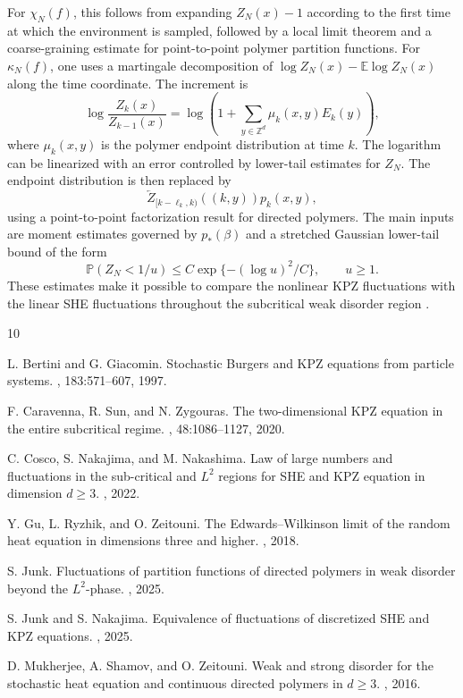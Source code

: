 \documentclass[12pt,centertags,oneside]{amsart}
\numberwithin{equation}{section}
\newcommand{\Z}{\mathbb Z}
\newcommand{\E}{\mathbb E}
\renewcommand{\P}{\mathbb P}
\begin{document}
For $\chi_N(f)$, this follows from expanding $Z_N(x)-1$ according to the first time at which the environment is sampled, followed by a local limit theorem and a coarse-graining estimate for point-to-point polymer partition functions. For $\kappa_N(f)$, one uses a martingale decomposition of $\log Z_N(x)-\E\log Z_N(x)$ along the time coordinate. The increment is
$$
\log\frac{Z_k(x)}{Z_{k-1}(x)}
=\log\left(1+\sum_{y\in\Z^d}\mu_k(x,y)E_k(y)\right),
$$
where $\mu_k(x,y)$ is the polymer endpoint distribution at time $k$. The logarithm can be linearized with an error controlled by lower-tail estimates for $Z_N$. The endpoint distribution is then replaced by
$$
\overleftarrow Z_{[k-\ell_k,k)}((k,y))p_k(x,y),
$$
using a point-to-point factorization result for directed polymers. The main inputs are moment estimates governed by $p_*(\beta)$ and a stretched Gaussian lower-tail bound of the form
$$
\P(Z_N<1/u)\leq C\exp\{-(\log u)^2/C\},\qquad u\geq 1.
$$
These estimates make it possible to compare the nonlinear KPZ fluctuations with the linear SHE fluctuations throughout the subcritical weak disorder region \cite{JunkNakajima2025}.

\begin{thebibliography}{10}

L. Bertini and G. Giacomin.
\newblock Stochastic Burgers and KPZ equations from particle systems.
, 183:571--607, 1997.

F. Caravenna, R. Sun, and N. Zygouras.
\newblock The two-dimensional KPZ equation in the entire subcritical regime.
, 48:1086--1127, 2020.

C. Cosco, S. Nakajima, and M. Nakashima.
\newblock Law of large numbers and fluctuations in the sub-critical and $L^2$ regions for SHE and KPZ equation in dimension $d\geq 3$.
, 2022.

Y. Gu, L. Ryzhik, and O. Zeitouni.
\newblock The Edwards--Wilkinson limit of the random heat equation in dimensions three and higher.
, 2018.

S. Junk.
\newblock Fluctuations of partition functions of directed polymers in weak disorder beyond the $L^2$-phase.
, 2025.

S. Junk and S. Nakajima.
\newblock Equivalence of fluctuations of discretized SHE and KPZ equations.
, 2025.

D. Mukherjee, A. Shamov, and O. Zeitouni.
\newblock Weak and strong disorder for the stochastic heat equation and continuous directed polymers in $d\geq 3$.
, 2016.

\end{thebibliography}
\end{document}
